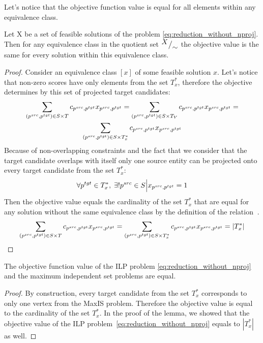 Let's notice that the objective function value is equal for all
elements within any equivalence class.
\begin{lemma}
  Let X be a set of feasible solutions of the problem \eqref{eq:reduction_without_nproj}. Then
  for any equivalence class in the quotient set \( {^{\textstyle X}\big/_{\textstyle \sim}} \) the objective
  value is the same for every solution within this equivalence class.
\end{lemma}
\begin{proof}
  Consider an equivalence class \( [x] \) of some feasible solution \( x \).
  Let's notice that non-zero scores have only elements from the set \( T^*_x \),
  therefore the objective determines by this set of projected target candidates:
  \begin{multline*}
    \sum\limits_{(p^{src}, p^{tgt}) \in S \times T} c_{p^{src}, p^{tgt}} x_{p^{src}, p^{tgt}} =
    \sum\limits_{(p^{src}, p^{tgt}) \in S \times T_V} c_{p^{src}, p^{tgt}} x_{p^{src}, p^{tgt}} = \\
    \sum\limits_{(p^{src}, p^{tgt}) \in S \times T^{*}_{x}} c_{p^{src}, p^{tgt}} x_{p^{src}, p^{tgt}}
  \end{multline*}
  Because of non-overlapping constraints and the fact that we consider that the target candidate overlaps with
  itself only one source entity can be projected onto every target candidate from the set \( T_x^* \):
  \[
    \forall p^{tgt} \in T^*_x, \; \exists! p^{src} \in S \Big| x_{p^{src}, p^{tgt}} = 1
  \]
  Then the objective value equals the cardinality of the set \( T^*_x \) that are equal for
  any solution without the same equivalence class by the definition of the relation \( ~ \).
  \[
    \sum\limits_{(p^{src}, p^{tgt}) \in S \times T} c_{p^{src}, p^{tgt}} x_{p^{src}, p^{tgt}} =
    \sum\limits_{(p^{src}, p^{tgt}) \in S \times T^{*}_{x}} c_{p^{src}, p^{tgt}} x_{p^{src}, p^{tgt}} =
    |T_x^*|
  \]
\end{proof}
\begin{corollary} \label{col:maxis_and_ilp_objective_equal}
  The objective function value of the ILP problem \eqref{eq:reduction_without_nproj} and the maximum independent
  set problems are equal.
\end{corollary}
\begin{proof}
  By construction, every target candidate from the set \( T^*_x \) corresponds to only one vertex
  from the MaxIS problem. Therefore the objective value is equal to the cardinality of the set \( T^*_x \).
  In the proof of the lemma, we showed that the objective value of the ILP problem~\eqref{eq:reduction_without_nproj}
  equals to \( | T^*_x| \) as well.
\end{proof}

